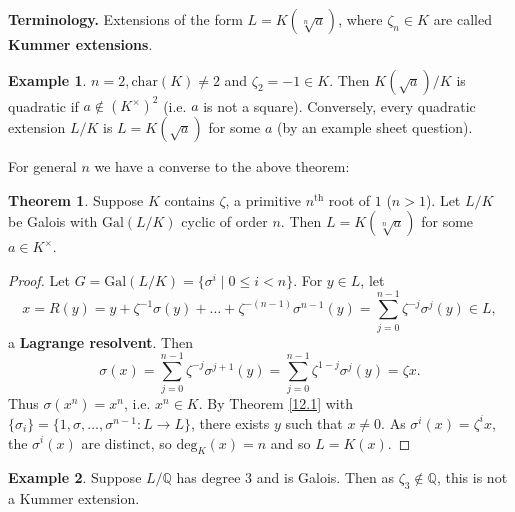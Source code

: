 \documentclass{article}
\theoremstyle{definition}
\newtheorem{theorem}{Theorem}[section]
\newtheorem{example}{Example}[section]
\begin{document}
\textbf{Terminology.} Extensions of the form $L=K(\sqrt[n]{a})$, where $\zeta_n \in K$ are called \textbf{Kummer extensions}. 
\begin{example}
    $n=2, \text{char}(K)\neq 2$ and $\zeta_2 = -1 \in K$. Then $K(\sqrt{a})/K$ is quadratic if $a \not\in (K^\times)^2$ (i.e. $a$ is not a square). Conversely, every quadratic extension $L/K$ is $L=K(\sqrt{a})$ for some $a$ (by an example sheet question).
\end{example}
For general $n$ we have a converse to the above theorem:
\begin{theorem}
    Suppose $K$ contains $\zeta$, a primitive $n^{\text{th}}$ root of $1$ ($n>1$). Let $L/K$ be Galois with $\text{Gal}(L/K)$ cyclic of order $n$. Then $L=K(\sqrt[n]{a})$ for some $a \in K^\times$.
\end{theorem}
\begin{proof}
    Let $G=\text{Gal}(L/K)=\{\sigma^i \mid 0\le i<n\}$. For $y \in L$, let $$x=R(y)=y + \zeta ^{-1}\sigma(y) + \ldots + \zeta^{-(n-1)}\sigma^{n-1}(y) = \sum_{j=0}^{n-1} \zeta^{-j}\sigma^j(y) \in L,$$
    a \textbf{Lagrange resolvent}. Then $$\sigma(x)=\sum_{j=0}^{n-1} \zeta^{-j}\sigma^{j+1}(y)=\sum_{j=0}^{n-1} \zeta^{1-j}\sigma^{j}(y) = \zeta x.$$ 
    Thus $\sigma(x^n)=x^n$, i.e. $x^n \in K$. By Theorem \ref{12.1} with $\{\sigma_i\} = \{1,\sigma,\ldots,\sigma^{n-1} : L \to L\}$, there exists $y$ such that $x\neq 0$. As $\sigma^i(x)=\zeta^i x$, the $\sigma^i(x)$ are distinct, so $\text{deg}_K(x)=n$ and so $L=K(x)$.
\end{proof}
\begin{example}
    Suppose $L/\mathbb{Q}$ has degree 3 and is Galois. Then as $\zeta_3 \not\in \mathbb{Q}$, this is not a Kummer extension.
\end{example}
\end{document}
